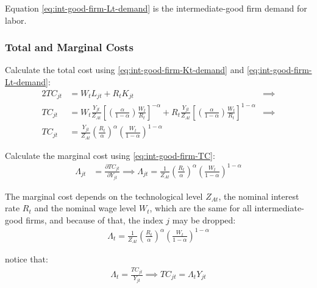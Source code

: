 \documentclass[
	thesis.tex
	]{subfiles}
\begin{document}
Equation \ref{eq:int-good-firm-Lt-demand} is the intermediate-good firm demand for labor.

\subsubsection*{Total and Marginal Costs}

Calculate the total cost using \ref{eq:int-good-firm-Kt-demand} and \ref{eq:int-good-firm-Lt-demand}:
\begin{alignat}{2}
	TC_{jt} & = W_t L_{jt} + R_t K_{jt} &\implies \nonumber \\
	TC_{jt} & = W_t \frac{Y_{jt}}{Z_{At}} \left[ \left( \frac{\alpha}{1-\alpha} \right) \frac{W_t}{R_t} \right]^{-\alpha} + R_t \frac{Y_{jt}}{Z_{At}} \left[ \left( \frac{\alpha}{1-\alpha} \right) \frac{W_t}{R_t} \right]^{1-\alpha} &\implies \nonumber \\
	TC_{jt} & = \frac{Y_{jt}}{Z_{At}} \left( \frac{R_t}{\alpha} \right)^{\alpha} \left( \frac{W_t}{1-\alpha} \right)^{1-\alpha} \label{eq:int-good-firm-TC}
\end{alignat}


Calculate the marginal cost using \ref{eq:int-good-firm-TC}: 
\begin{align}
	\label{eq:int-good-firm-MC}
	\Lambda_{jt} & = \frac{\partial TC_{jt}}{\partial Y_{jt}}
	\implies 
	\Lambda_{jt} = \frac{1}{Z_{At}} \left( \frac{R_t}{\alpha} \right)^{\alpha} \left( \frac{W_t}{1-\alpha} \right)^{1-\alpha}
\end{align}

The marginal cost depends on the technological level $Z_{At}$, the nominal interest rate $R_t$ and the nominal wage level $W_t$, which are the same for all intermediate-good firms, and because of that, the index $j$ may be dropped:
\begin{align}
	\label{eq:int-good-firm-MC-2}
	\Lambda_t = \frac{1}{Z_{At}} \left( \frac{R_t}{\alpha} \right)^{\alpha} \left( \frac{W_t}{1-\alpha} \right)^{1-\alpha}
\end{align}

notice that:
\begin{align}
	\label{eq:int-good-firm-TC-MC}
	\Lambda_t = \frac{TC_{jt}}{Y_{jt}} \implies 
	TC_{jt} = \Lambda_t Y_{jt}
\end{align}

\end{document}
